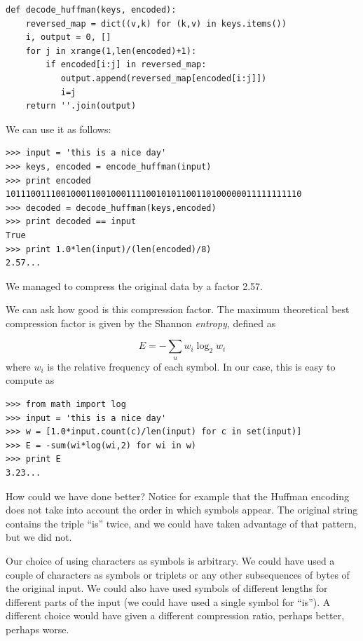 \documentclass[justified,sixbynine]{tufte-book}
\def\ft{\small\tt}
\theoremstyle{plain}%
\theoremstyle{definition}
\theoremstyle{remark}
\begin{document}
\begin{fullwidth}
\begin{lstlisting}[caption={in file: {\ft nlib.py}}]
def decode_huffman(keys, encoded):
    reversed_map = dict((v,k) for (k,v) in keys.items())
    i, output = 0, []
    for j in xrange(1,len(encoded)+1):
        if encoded[i:j] in reversed_map:
           output.append(reversed_map[encoded[i:j]])
           i=j
    return ''.join(output)
\end{lstlisting}

We can use it as follows:

\begin{lstlisting}[caption={in file: {\ft nlib.py}}]
>>> input = 'this is a nice day'
>>> keys, encoded = encode_huffman(input)
>>> print encoded
10111001110010001100100011110010101100110100000011111111110
>>> decoded = decode_huffman(keys,encoded)
>>> print decoded == input
True
>>> print 1.0*len(input)/(len(encoded)/8)
2.57...
\end{lstlisting}

We managed to compress the original data by a factor 2.57.


We can ask how good is this compression factor.
The maximum theoretical best compression factor is given by the Shannon {\it entropy}, defined as

\begin{equation}
E = -\sum_u w_i \log_2 w_i
\end{equation}
where $w_i$ is the relative frequency of each symbol.
In our case, this is easy to compute as

\begin{lstlisting}[caption={in file: {\ft nlib.py}}]
>>> from math import log
>>> input = 'this is a nice day'
>>> w = [1.0*input.count(c)/len(input) for c in set(input)]
>>> E = -sum(wi*log(wi,2) for wi in w)
>>> print E
3.23...
\end{lstlisting}

How could we have done better? Notice for example that the Huffman encoding does not take into account the order in which symbols appear. The original string contains the triple ``is'' twice, and we could have taken advantage of that pattern, but we did not.

Our choice of using characters as symbols is arbitrary. We could have used a couple of characters as symbols or triplets or any other subsequences of bytes of the original input. We could also have used symbols of different lengths for different parts of the input (we could have used a single symbol for ``is''). A different choice would have given a different compression ratio, perhaps better, perhaps worse.


\end{fullwidth}
\end{document}
